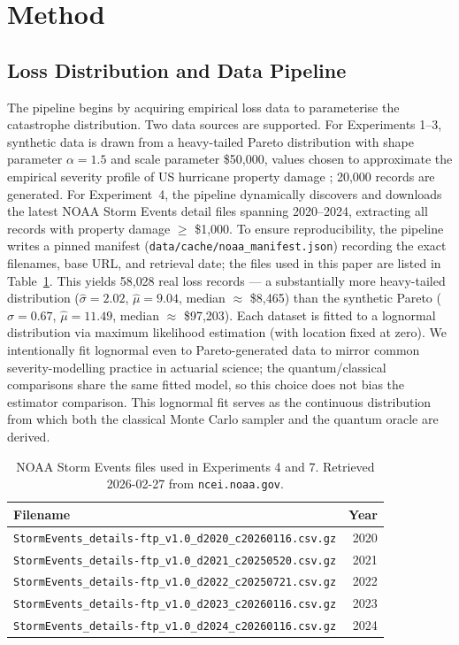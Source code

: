 \documentclass[11pt,a4paper]{article}
\begin{document}
\section{Method}
\label{sec:method}

\subsection{Loss Distribution and Data Pipeline}

The pipeline begins by acquiring empirical loss data to parameterise the catastrophe distribution. Two data sources are supported. For Experiments 1--3, synthetic data is drawn from a heavy-tailed Pareto distribution with shape parameter $\alpha = 1.5$ and scale parameter \$50{,}000, values chosen to approximate the empirical severity profile of US hurricane property damage \citep{grossi2005catastrophe}; 20{,}000 records are generated. For Experiment~4, the pipeline dynamically discovers and downloads the latest NOAA Storm Events detail files \citep{noaa2024storm} spanning 2020--2024, extracting all records with property damage $\geq$ \$1{,}000. To ensure reproducibility, the pipeline writes a pinned manifest (\texttt{data/cache/noaa\_manifest.json}) recording the exact filenames, base URL, and retrieval date; the files used in this paper are listed in Table~\ref{tab:noaa_manifest}. This yields 58{,}028 real loss records --- a substantially more heavy-tailed distribution ($\hat{\sigma} = 2.02$, $\hat{\mu} = 9.04$, median $\approx$ \$8{,}465) than the synthetic Pareto ($\hat{\sigma} = 0.67$, $\hat{\mu} = 11.49$, median $\approx$ \$97{,}203). Each dataset is fitted to a lognormal distribution via maximum likelihood estimation (with location fixed at zero). We intentionally fit lognormal even to Pareto-generated data to mirror common severity-modelling practice in actuarial science; the quantum/classical comparisons share the same fitted model, so this choice does not bias the estimator comparison. This lognormal fit serves as the continuous distribution from which both the classical Monte Carlo sampler and the quantum oracle are derived.

\begin{table}[ht]
\centering
\caption{NOAA Storm Events files used in Experiments 4 and 7. Retrieved 2026-02-27 from \texttt{ncei.noaa.gov}.}
\label{tab:noaa_manifest}
\begin{tabular}{lr}
\toprule
Filename & Year \\
\midrule
\texttt{StormEvents\_details-ftp\_v1.0\_d2020\_c20260116.csv.gz} & 2020 \\
\texttt{StormEvents\_details-ftp\_v1.0\_d2021\_c20250520.csv.gz} & 2021 \\
\texttt{StormEvents\_details-ftp\_v1.0\_d2022\_c20250721.csv.gz} & 2022 \\
\texttt{StormEvents\_details-ftp\_v1.0\_d2023\_c20260116.csv.gz} & 2023 \\
\texttt{StormEvents\_details-ftp\_v1.0\_d2024\_c20260116.csv.gz} & 2024 \\
\bottomrule
\end{tabular}
\end{table}
\end{document}
